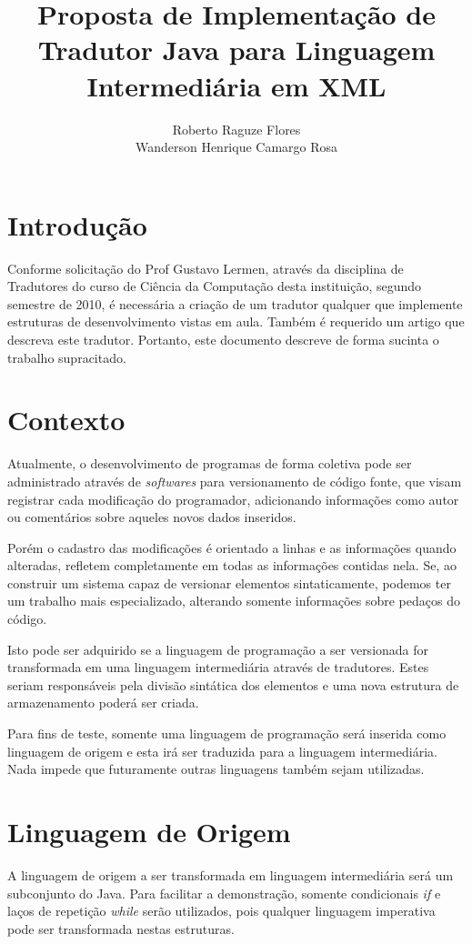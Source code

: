 \documentclass{article}
\title{Proposta de Implementação de Tradutor Java para Linguagem Intermediária
em XML}
\author{Roberto Raguze Flores\inst{1}\\Wanderson Henrique Camargo Rosa\inst{1}}
\begin{document}
\maketitle{}

\section{Introdução}

Conforme solicitação do Prof Gustavo Lermen, através da disciplina de Tradutores
do curso de Ciência da Computação desta instituição, segundo semestre de 2010,
é necessária a criação de um tradutor qualquer que implemente estruturas de 
desenvolvimento vistas em aula. Também é requerido um artigo que descreva este
tradutor. Portanto, este documento descreve de forma sucinta o trabalho
supracitado.

\section{Contexto}

Atualmente, o desenvolvimento de programas de forma coletiva pode ser
administrado através de \emph{softwares} para versionamento de código fonte, que
visam registrar cada modificação do programador, adicionando informações como
autor ou comentários sobre aqueles novos dados inseridos.

Porém o cadastro das modificações é orientado a linhas e as informações quando
alteradas, refletem completamente em todas as informações contidas nela. Se, ao
construir um sistema capaz de versionar elementos sintaticamente, podemos ter um
trabalho mais especializado, alterando somente informações sobre pedaços do
código.

Isto pode ser adquirido se a linguagem de programação a ser versionada for
transformada em uma linguagem intermediária através de tradutores. Estes seriam
responsáveis pela divisão sintática dos elementos e uma nova estrutura de
armazenamento poderá ser criada.

Para fins de teste, somente uma linguagem de programação será inserida como
linguagem de origem e esta irá ser traduzida para a linguagem intermediária.
Nada impede que futuramente outras linguagens também sejam utilizadas.

\section{Linguagem de Origem}

A linguagem de origem a ser transformada em linguagem intermediária será um
subconjunto do Java. Para facilitar a demonstração, somente condicionais
\emph{if} e laços de repetição \emph{while} serão utilizados, pois qualquer
linguagem imperativa pode ser transformada nestas estruturas.
\end{document}
